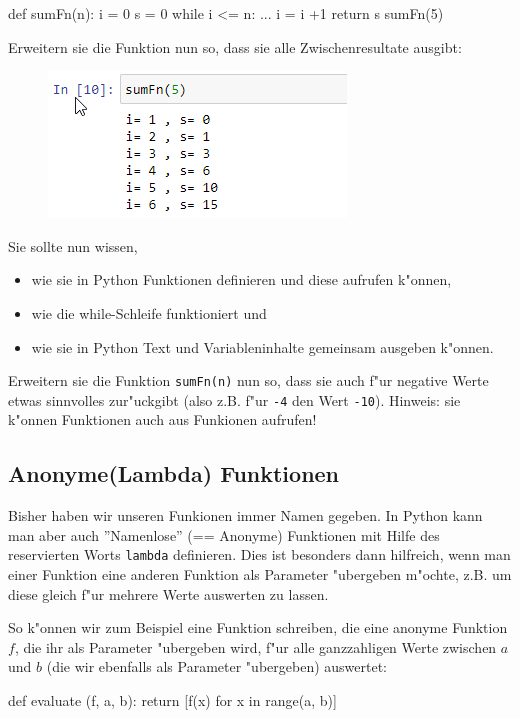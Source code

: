 \documentclass{article}
\begin{document}
\begin{python}
def sumFn(n):
    i = 0
    s = 0
    while i <= n:
        ...
        i = i +1
    return s
sumFn(5)

\end{python}
Erweitern sie die Funktion nun so, dass sie alle Zwischenresultate ausgibt:
\begin{figure}[H]
\centering
\includegraphics{sumFnOutput.png}
\end{figure} \noindent
Sie sollte nun wissen,
\begin{itemize}
\item wie sie in Python Funktionen definieren und diese aufrufen k"onnen,
\item wie die while-Schleife funktioniert und
\item wie sie in Python Text und Variableninhalte gemeinsam ausgeben k"onnen.
\end{itemize}
Erweitern sie die Funktion \verb+sumFn(n)+ nun so, dass sie auch f"ur negative Werte etwas \glqq sinnvolles\grqq{} zur"uckgibt (also z.B. f"ur \verb+-4+ den Wert \verb+-10+). Hinweis: sie k"onnen Funktionen auch aus Funkionen aufrufen!


\subsection*{Anonyme(Lambda) Funktionen}
Bisher haben wir unseren Funkionen immer Namen gegeben. In Python kann man aber auch ''Namenlose'' (== Anonyme) Funktionen
mit Hilfe des reservierten Worts {\verb+lambda+} definieren. Dies ist besonders dann hilfreich, wenn man einer Funktion eine
anderen Funktion als Parameter "ubergeben m"ochte, z.B. um diese gleich f"ur mehrere Werte auswerten zu lassen.

So k"onnen wir zum Beispiel eine Funktion schreiben, die eine anonyme Funktion $f$, die ihr als Parameter "ubergeben wird, f"ur
alle ganzzahligen Werte zwischen $a$ und $b$ (die wir ebenfalls als Parameter "ubergeben) auswertet:

\begin{python}
def evaluate (f, a, b):
  return [f(x) for x in range(a, b)]
\end{python}
\end{document}
